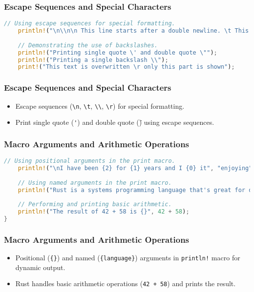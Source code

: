 \documentclass[aspectratio=169, table]{beamer}
\begin{document}
\begin{frame}[fragile]
\frametitle{Escape Sequences and Special Characters}
\begin{lstlisting}[language=Rust]
	// Using escape sequences for special formatting.
	println!("\n\\n\n This line starts after a double newline. \t This line has a tab.");
	
	// Demonstrating the use of backslashes.
	println!("Printing single quote \' and double quote \"");
	println!("Printing a single backslash \\");
	print!("This text is overwritten \r only this part is shown");
\end{lstlisting}
\end{frame}

\begin{frame}
\frametitle{Escape Sequences and Special Characters}
\begin{itemize}
	\item Escape sequences (\texttt{\textbackslash n}, \texttt{\textbackslash t}, \texttt{\textbackslash\textbackslash}, \texttt{\textbackslash r}) for special formatting.
	\item Print single quote (\texttt{\'}) and double quote (\texttt{\"}) using escape sequences.
\end{itemize}
\end{frame}

\begin{frame}[fragile]
\frametitle{Macro Arguments and Arithmetic Operations}
\begin{lstlisting}[language=Rust]
	// Using positional arguments in the print macro.
	println!("\nI have been {2} for {1} years and I {0} it", "enjoying", 15, "coding");
	
	// Using named arguments in the print macro.
	println!("Rust is a systems programming language that's great for development.");
	
	// Performing and printing basic arithmetic.
	println!("The result of 42 + 58 is {}", 42 + 58);
}
\end{lstlisting}
\end{frame}

\begin{frame}
\frametitle{Macro Arguments and Arithmetic Operations}
\begin{itemize}
\item Positional (\texttt{\{\}}) and named (\texttt{\{language\}}) arguments in \texttt{println!} macro for dynamic output.
\item Rust handles basic arithmetic operations (\texttt{42 + 58}) and prints the result.
\end{itemize}
\end{frame}
\end{document}
